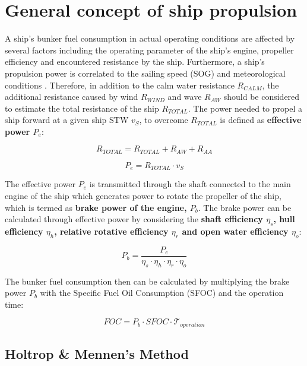 \section{General concept of ship propulsion}\label{sec:power_calc}

A ship's bunker fuel consumption in actual operating conditions are affected by several factors including the operating parameter of the ship's engine, propeller efficiency and encountered resistance by the ship. Furthermore, a ship's propulsion power is correlated to the sailing speed (SOG) and meteorological conditions . Therefore, in addition to the calm water resistance $R_{CALM}$, the additional resistance caused by wind $R_{WIND}$ and wave $R_{AW}$ should be considered to estimate the total resistance of the ship $R_{TOTAL}$. The power needed to propel a ship forward at a given ship STW $v_S$, to overcome $R_{TOTAL}$ is defined as \textbf{effective power $P_e$}:

\begin{equation}\label{eqn:R_tot}
    R_{TOTAL} = R_{TOTAL} + R_{AW} + R_{AA} 
\end{equation}

\begin{equation}\label{eqn:P_e}
    P_e = R_{TOTAL}\cdot v_{S}
\end{equation}

The effective power $P_e$ is transmitted through the shaft connected to the main engine of the ship which generates power to rotate the propeller of the ship, which is termed as \textbf{brake power of the engine, $P_b$}. The brake power can be calculated through effective power by considering the \textbf{shaft efficiency $\eta_s$, hull efficiency $\eta_h$, relative rotative efficiency $\eta_r$ and open water efficiency $\eta_o$}:

\begin{equation}\label{eqn:P_b}
    P_b = \frac{P_e}{\eta_s\cdot\eta_h\cdot\eta_r\cdot\eta_o}
\end{equation}

The bunker fuel consumption then can be calculated by multiplying the brake power $P_b$ with the Specific Fuel Oil Consumption (SFOC) and the operation time:

\begin{equation}\label{eqn:FOC}
    FOC = P_b\cdot SFOC\cdot \mathcal{T}_{operation} 
\end{equation}


\subsection{Holtrop \& Mennen's Method}\label{sec:foc_calc}

